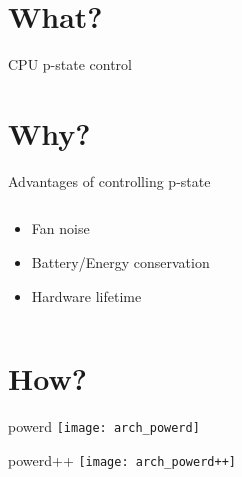 \documentclass[aspectratio=169]{beamer}
\begin{document}
\section{What?}

\begin{frame}{CPU p-state control}
\centering
{}
\end{frame}

\section{Why?}

\begin{frame}{Advantages of controlling p-state}
\begin{columns}[onlytextwidth]
\begin{column}{0.5\textwidth}
\begin{itemize}
\item<2-> Fan noise
\item<3-> Battery/Energy conservation
\item<4-> Hardware lifetime
\end{itemize}
\end{column}
\begin{column}{0.5\textwidth}
\begin{tikzpicture}[scale=.5]


\end{tikzpicture}
\end{column}
\end{columns}
\end{frame}

\section{How?}

\begin{frame}{powerd}
\centering
\texttt{[image: arch\_powerd]}
\end{frame}

\begin{frame}{powerd++}
\centering
\texttt{[image: arch\_powerd++]}
\end{frame}
\end{document}
